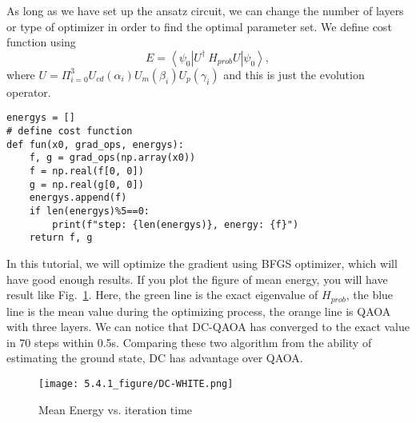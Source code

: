 As long as we have set up the ansatz circuit, we can change the number of layers or type of optimizer in order to find the optimal parameter set. We define cost function using
\begin{equation}
    E = \left<\psi_0\right|U^{\dagger}\ H_{prob} U\left|\psi_0\right>,
\end{equation}
where $U = \Pi_{i=0}^3 U_{cd}(\alpha_i)U_m(\beta_i)U_p(\gamma_i)$ and this is just the evolution operator.
\begin{lstlisting}
energys = []
# define cost function
def fun(x0, grad_ops, energys):
    f, g = grad_ops(np.array(x0))
    f = np.real(f[0, 0])
    g = np.real(g[0, 0])
    energys.append(f)
    if len(energys)%5==0:
        print(f"step: {len(energys)}, energy: {f}")
    return f, g
\end{lstlisting}

In this tutorial, we will optimize the gradient using BFGS optimizer\cite{chandarana2022meta}, which will have good enough results. If you plot the figure of mean energy, you will have result like Fig.~\ref{fig:dc}. Here, the green line is the exact eigenvalue of $H_{prob}$, the blue line is the mean value during the optimizing process, the orange line is QAOA with three layers. We can notice that DC-QAOA  has converged to the exact value in 70 steps within 0.5s. Comparing these two algorithm from the ability of estimating the ground state, DC has advantage over QAOA.
\begin{figure}
    \centering
    \texttt{[image: 5.4.1\_figure/DC-WHITE.png]}
    \caption{Mean Energy vs. iteration time}
    \label{fig:dc}
\end{figure}
